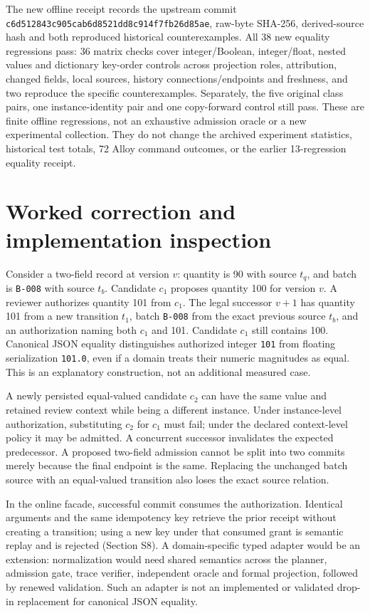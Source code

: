 \documentclass[11pt,a4paper]{article}
\newcommand{\code}[1]{\nolinkurl{#1}}
\begin{document}
The new offline receipt records the upstream commit \code{c6d512843c905cab6d8521dd8c914f7fb26d85ae}, raw-byte SHA-256, derived-source hash and both reproduced historical counterexamples. All 38 new equality regressions pass: 36 matrix checks cover integer/Boolean, integer/float, nested values and dictionary key-order controls across projection roles, attribution, changed fields, local sources, history connections/endpoints and freshness, and two reproduce the specific counterexamples. Separately, the five original class pairs, one instance-identity pair and one copy-forward control still pass. These are finite offline regressions, not an exhaustive admission oracle or a new experimental collection. They do not change the archived experiment statistics, historical test totals, 72 Alloy command outcomes, or the earlier 13-regression equality receipt.

\section{Worked correction and implementation inspection}
\label{app:worked-example}

Consider a two-field record at version $v$: quantity is 90 with source $t_q$, and batch is \code{B-008} with source $t_b$. Candidate $c_1$ proposes quantity 100 for version $v$. A reviewer authorizes quantity 101 from $c_1$. The legal successor $v+1$ has quantity 101 from a new transition $t_1$, batch \code{B-008} from the exact previous source $t_b$, and an authorization naming both $c_1$ and 101. Candidate $c_1$ still contains 100. Canonical JSON equality distinguishes authorized integer \code{101} from floating serialization \code{101.0}, even if a domain treats their numeric magnitudes as equal. This is an explanatory construction, not an additional measured case.

A newly persisted equal-valued candidate $c_2$ can have the same value and retained review context while being a different instance. Under instance-level authorization, substituting $c_2$ for $c_1$ must fail; under the declared context-level policy it may be admitted. A concurrent successor invalidates the expected predecessor. A proposed two-field admission cannot be split into two commits merely because the final endpoint is the same. Replacing the unchanged batch source with an equal-valued transition also loses the exact source relation.

In the online facade, successful commit consumes the authorization. Identical arguments and the same idempotency key retrieve the prior receipt without creating a transition; using a new key under that consumed grant is semantic replay and is rejected (Section S8). A domain-specific typed adapter would be an extension: normalization would need shared semantics across the planner, admission gate, trace verifier, independent oracle and formal projection, followed by renewed validation. Such an adapter is not an implemented or validated drop-in replacement for canonical JSON equality.
\end{document}
